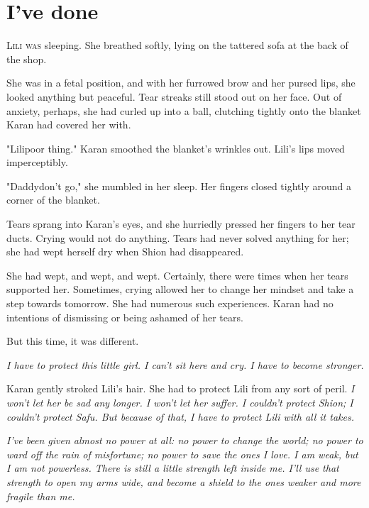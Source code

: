 
\chapter{I've done}


\lettrine{L}{ili was} sleeping. She breathed softly, lying on the tattered sofa at
the back of the shop.

She was in a fetal position, and with her furrowed brow and her pursed
lips, she looked anything but peaceful. Tear streaks still stood out on
her face. Out of anxiety, perhaps, she had curled up into a ball,
clutching tightly onto the blanket Karan had covered her with.

"Lili\el poor thing." Karan smoothed the blanket's wrinkles out. Lili's
lips moved imperceptibly.

"Daddy\el don't go," she mumbled in her sleep. Her fingers closed
tightly around a corner of the blanket.

Tears sprang into Karan's eyes, and she hurriedly pressed her fingers to
her tear ducts. Crying would not do anything. Tears had never solved
anything for her; she had wept herself dry when Shion had disappeared.

She had wept, and wept, and wept. Certainly, there were times when her
tears supported her. Sometimes, crying allowed her to change her mindset
and take a step towards tomorrow. She had numerous such experiences.
Karan had no intentions of dismissing or being ashamed of her tears.

But this time, it was different.

\emph{I have to protect this little girl. I can't sit here and cry. I have to
become stronger.}

Karan gently stroked Lili's hair. She had to protect Lili from any sort
of peril. \emph{I won't let her be sad any longer. I won't let her suffer. I
couldn't protect Shion; I couldn't protect Safu. But because of that, I
have to protect Lili with all it takes.}

\emph{I've been given almost no power at all: no power to change the world; no
power to ward off the rain of misfortune; no power to save the ones I
love. I am weak, but I am not powerless. There is still a little
strength left inside me. I'll use that strength to open my arms wide,
and become a shield to the ones weaker and more fragile than me.}

